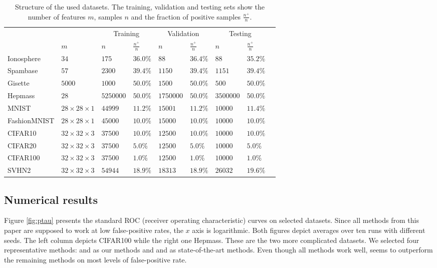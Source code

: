\begin{table}[!ht]
  \caption{Structure of the used datasets. The training, validation and testing sets show the number of features $m$, samples $n$ and the fraction of positive samples $\frac{n^+}{n}$.}
  \label{tab:counts}
  \centering
  \begin{tabular}{@{}lllllllll@{}}
    \toprule
    &  & \multicolumn{2}{c}{Training} & \multicolumn{2}{c}{Validation} & \multicolumn{2}{c}{Testing} \\ \cmidrule(lr){3-4} \cmidrule(lr){5-6} \cmidrule(l){7-8} 
    & $m$ & $n$ & $\frac{n^+}{n}$ & $n$ & $\frac{n^+}{n}$ & $n$ & $\frac{n^+}{n}$ \\ \midrule
    Ionosphere
      & $34$
      & $175$ & $36.0\%$ & $88$ & $36.4\%$ & $88$ & $35.2\%$ \\
    Spambase
      & $57$
      & $2300$ & $39.4\%$ & $1150$ & $39.4\%$ & $1151$ & $39.4\%$ \\
    Gisette
      & $5000$
      & $1000$ & $50.0\%$ & $1500$ & $50.0\%$ & $500$ & $50.0\%$ \\
    Hepmass
      & $28$
      & $5250000$ & $50.0\%$ & $1750000$ & $50.0\%$ & $3500000$ & $50.0\%$ \\
    MNIST
      & $28 \times 28 \times 1$
      & $44999$ & $11.2\%$ & $15001$ & $11.2\%$ & $10000$ & $11.4\%$ \\
    FashionMNIST
      & $28 \times 28\times 1$
      & $45000$ & $10.0\%$ & $15000$ & $10.0\%$ & $10000$ & $10.0\%$ \\
    CIFAR10
      & $32\times 32\times 3$
      & $37500$ & $10.0\%$ & $12500$ & $10.0\%$ & $10000$ & $10.0\%$ \\
    CIFAR20
      & $32 \times 32\times 3$
      & $37500$ & $5.0\%$ & $12500$ & $5.0\%$ & $10000$ & $5.0\%$ \\
    CIFAR100
      & $32 \times 32\times 3$
      & $37500$ & $1.0\%$ & $12500$ & $1.0\%$ & $10000$ & $1.0\%$ \\
    SVHN2
      & $32 \times 32\times 3$
      & $54944$ & $18.9\%$ & $18313$ & $18.9\%$ & $26032$ & $19.6\%$ \\
    \bottomrule
  \end{tabular}
\end{table}

\subsection{Numerical results}

Figure \ref{fig:ptau} presents the standard ROC (receiver operating characteristic) curves on selected datasets. Since all methods from this paper are supposed to work at low false-positive rates, the $x$ axis is logarithmic. Both figures depict averages over ten runs with different seeds. The left column depicts CIFAR100 while the right one Hepmass. These are the two more complicated datasets. We selected four representative methods: \PatMat and \PatMatNP as our methods and \TopPush and \tauFPL as state-of-the-art methods. Even though all methods work well, \PatMatNP seems to outperform the remaining methods on most levels of false-positive rate.

